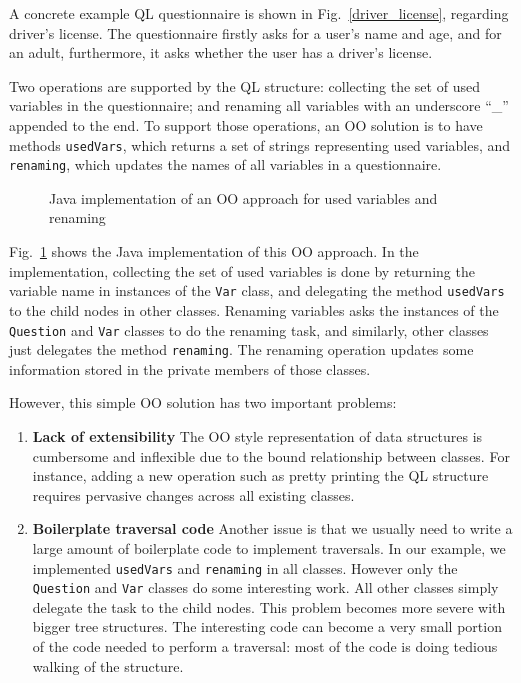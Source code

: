 A concrete example QL questionnaire is shown in Fig.~\ref{driver_license}, regarding driver's license. The questionnaire firstly asks for a user's name and age, and for an adult, furthermore, it asks whether the user has a driver's license.

Two operations are supported by the QL structure: collecting the set of used variables in the questionnaire; and renaming all variables with an underscore ``\_'' appended to the end. To support those operations, an OO solution is to have methods \lstinline{usedVars}, which returns a set of strings representing used variables, and \lstinline{renaming}, which updates the names of all variables in a questionnaire.

\begin{figure}[htbp]
\nocaptionrule
\caption{Java implementation of an OO approach for used variables and renaming}
\label{ql_oo_approach}
\end{figure}

Fig.~\ref{ql_oo_approach} shows the Java implementation of this OO approach. In the implementation, collecting the set of used variables is done by returning the variable name in instances of the \lstinline{Var} class, and delegating the method \lstinline{usedVars} to the child nodes in other classes. Renaming variables asks the instances of the \lstinline{Question} and \lstinline{Var} classes to do the renaming task, and similarly, other classes just delegates the method \lstinline{renaming}. The renaming operation updates some information stored in the private members of those classes.

However, this simple OO solution has two important problems:

\begin{enumerate}

\item {\bf Lack of extensibility} The OO style
  representation of data structures is cumbersome and
  inflexible due to the bound relationship between classes. For
  instance, adding a new operation such as pretty
  printing the QL structure requires pervasive changes across all
  existing classes.

\item {\bf Boilerplate traversal code} Another issue is that we
  usually need to write a large amount of boilerplate code to
  implement traversals. In our example, we implemented
  \lstinline{usedVars} and \lstinline{renaming} in all
  classes. However only the \lstinline{Question} and \lstinline{Var} classes do some
  interesting work. All other classes simply delegate the task to the
  child nodes. This problem becomes more severe with bigger tree
  structures. The interesting code can become a very small portion of
  the code needed to perform a traversal: most of the code is doing
  tedious walking of the structure.

\end{enumerate}

